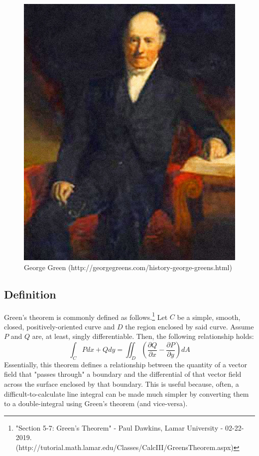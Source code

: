 \documentclass[11pt,English]{article}
\begin{document}
\begin{figure}
    \centering
    \includegraphics[scale=.2]{George_Green.jpg}
    \caption{George Green (http://georgegreens.com/history-george-greens.html)}
    \label{fig:my_label}
\end{figure}

\subsection{Definition}
Green's theorem is commonly defined as follows.\footnote{"Section 5-7: Green's Theorem" - Paul Dawkins, Lamar University - 02-22-2019. (http://tutorial.math.lamar.edu/Classes/CalcIII/GreensTheorem.aspx)} Let $C$ be a simple, smooth, closed, positively-oriented curve and $D$ the region enclosed by said curve. Assume $P$ and $Q$ are, at least, singly differentiable. Then, the following relationship holds:
$$
\int_C{ P dx + Q dy } = \iint_D{ \left( \frac{\partial Q}{\partial x} - \frac{\partial P}{\partial y} \right) dA }
$$
Essentially, this theorem defines a relationship between the quantity of a vector field that "passes through" a boundary and the differential of that vector field across the surface enclosed by that boundary. This is useful because, often, a difficult-to-calculate line integral can be made much simpler by converting them to a double-integral using Green's theorem (and vice-versa).
\end{document}
